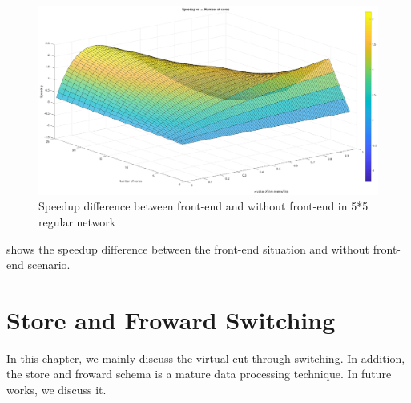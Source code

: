\begin{figure}[!ht]
\centering
\includegraphics[width=1\columnwidth]{figure/sacom5t5f_nof.eps}
\caption{ Speedup difference between front-end and without front-end in 5*5 regular network}
\label{fig:sacom5t5f_nof}
\end{figure}

 shows the speedup difference between the front-end situation and without front-end scenario.  


\newpage
\section{Store and Froward Switching}
In this chapter, we mainly discuss the virtual cut through \cite{kermani1979virtual} switching.  In addition, the store and froward \cite{kanthraj2007store} schema is a mature data processing technique.  In future works, we discuss it.
